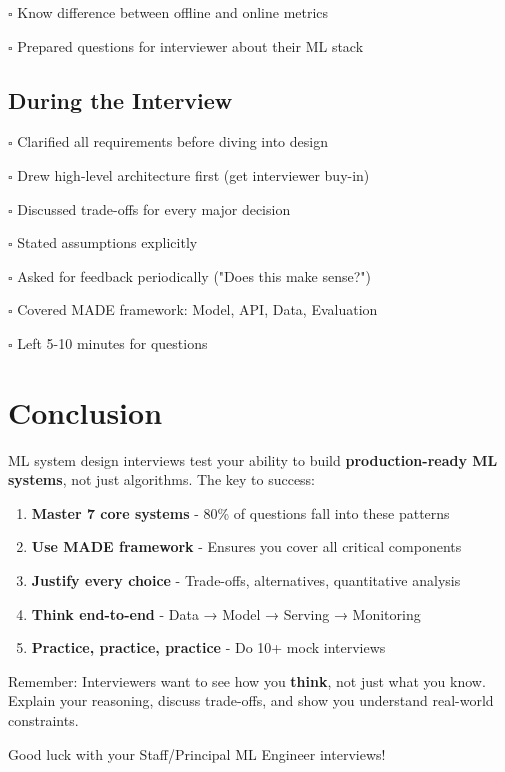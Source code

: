 \documentclass[10pt]{article}
\begin{document}
$\square$ Know difference between offline and online metrics

$\square$ Prepared questions for interviewer about their ML stack

\subsection{During the Interview}

$\square$ Clarified all requirements before diving into design

$\square$ Drew high-level architecture first (get interviewer buy-in)

$\square$ Discussed trade-offs for every major decision

$\square$ Stated assumptions explicitly

$\square$ Asked for feedback periodically ("Does this make sense?")

$\square$ Covered MADE framework: Model, API, Data, Evaluation

$\square$ Left 5-10 minutes for questions

\section{Conclusion}

ML system design interviews test your ability to build \textbf{production-ready ML systems}, not just algorithms. The key to success:

\begin{enumerate}
\item \textbf{Master 7 core systems} - 80\% of questions fall into these patterns
\item \textbf{Use MADE framework} - Ensures you cover all critical components
\item \textbf{Justify every choice} - Trade-offs, alternatives, quantitative analysis
\item \textbf{Think end-to-end} - Data → Model → Serving → Monitoring
\item \textbf{Practice, practice, practice} - Do 10+ mock interviews
\end{enumerate}

Remember: Interviewers want to see how you \textbf{think}, not just what you know. Explain your reasoning, discuss trade-offs, and show you understand real-world constraints.

Good luck with your Staff/Principal ML Engineer interviews!
\end{document}
